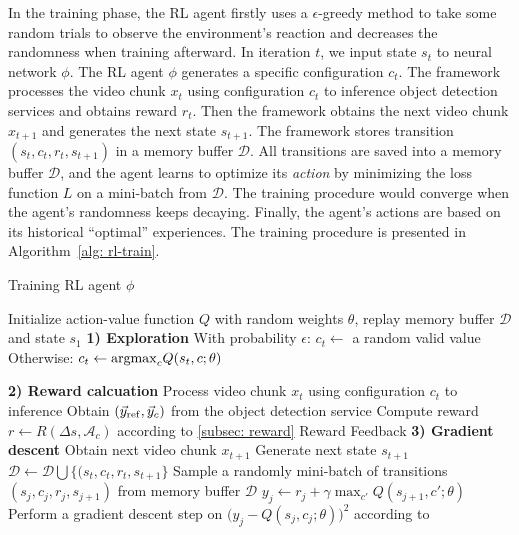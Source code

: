 In the training phase, the RL agent firstly uses a $\epsilon$-greedy method to take some random trials to observe the environment's reaction and decreases the randomness when training afterward. In iteration $t$, we input state $s_t $ to neural network $ \phi $. The RL agent $\phi$ generates a specific configuration $c_t$. The framework processes the video chunk $x_t$ using configuration $c_t$ to inference object detection services and obtains reward $r_t$. Then the framework obtains the next video chunk $x_{t+1}$ and generates the next state $ s_{t+1} $. The framework stores transition $(s_t, c_t, r_t, s_{t+1})$ in a memory buffer $\mathcal{D}$. All transitions are saved into a memory buffer $ \mathcal{D} $, and the agent learns to optimize its \emph{action} by minimizing the loss function $ L $ on a mini-batch from $ \mathcal{D} $. The training procedure would converge when the agent's randomness keeps decaying. Finally, the agent's actions are based on its historical ``optimal'' experiences. The training procedure is presented in Algorithm~\ref{alg: rl-train}.

\setlength{\textfloatsep}{0.1cm}
\begin{algorithm}[!t]
		\caption{Training RL agent $ \phi $} %
		\label{alg: rl-train}
		\begin{algorithmic}[1]	
			\STATE Initialize action-value function $ Q $ with random weights $ \theta $, replay memory buffer $ \mathcal{D} $ and state $ s_1 $				
			\STATE \textbf{1) Exploration}
			\STATE With probability $\epsilon$:
			\STATE \hspace{1em} $c_t \leftarrow$ a random valid value 
			\STATE Otherwise:
			\STATE \hspace{1em} $ c_t \leftarrow {\rm argmax}_cQ(s_t, c; \theta) $ 

			\STATE \textbf{2) Reward calcuation} 
			\STATE Process video chunk $ x_t $ using configuration $ c_t $ to inference
			\STATE Obtain $ (\vec{y}_{\rm ref}, \vec{y}_c) $ from the object detection service
			\STATE Compute reward $ r \leftarrow R(\Delta s, \mathcal{A}_c) $ according to \ref{subsec: reward} Reward Feedback 
			\STATE \textbf{3) Gradient descent}
			\STATE Obtain next video chunk $ x_{t+1} $
			\STATE Generate next state $ s_{t+1} $
			\STATE $ \mathcal{D} \leftarrow \mathcal{D} \bigcup \{(s_t, c_t, r_t, s_{t+1} \} $
			\STATE Sample a randomly mini-batch of transitions $ (s_j, c_j, r_j, s_{j+1}) $ from memory buffer $ \mathcal{D} $
			\STATE $ y_j \leftarrow r_j + \gamma \max_{c'}Q(s_{j+1}, c'; \theta) $
			\STATE Perform a gradient descent step on $ \big(y_j - Q(s_j, c_j; \theta)\big)^2 $ according to~\cite{DQN}
			\ENDFOR
		\end{algorithmic}
\end{algorithm}
\setlength{\floatsep}{0.1cm}

